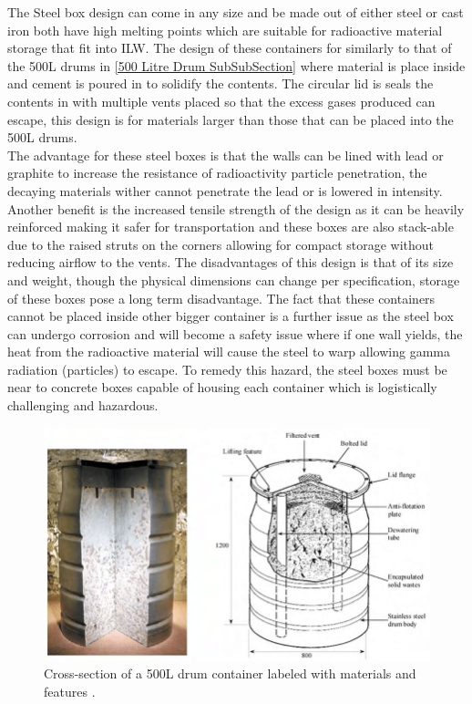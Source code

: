 The Steel box design can come in any size and be made out of either steel or cast iron both have high melting points which are suitable for radioactive material storage that fit into ILW. The design of these containers for similarly to that of the 500L drums in \cref{500 Litre Drum SubSubSection} where material is place inside and cement is poured in to solidify the contents. The circular lid is seals the contents in with multiple vents placed so that the excess gases produced can escape, this design is for materials larger than those that can be placed into the 500L drums. \\

The advantage for these steel boxes is that the walls can be lined with lead or graphite to increase the resistance of radioactivity particle penetration, the decaying materials wither cannot penetrate the lead or is lowered in intensity. Another benefit is the increased tensile strength of the design as it can be heavily reinforced making it safer for transportation and these boxes are also stack-able due to the raised struts on the corners allowing for compact storage without reducing airflow to the vents. The disadvantages of this design is that of its size and weight, though the physical dimensions can change per specification, storage of these boxes pose a long term disadvantage. The fact that these containers cannot be placed inside other bigger container is a further issue as the steel box can undergo corrosion and will become a safety issue where if one wall yields, the heat from the radioactive material will cause the steel to warp allowing gamma radiation (particles) to escape. To remedy this hazard, the steel boxes must be near to concrete boxes capable of housing each container which is logistically challenging and hazardous.

\begin{figure}[H]
\centering
\includegraphics[scale=0.5]{Media/NuclearResearch/shows-the-500-litre-drum-waste-package-designs-The-majority-of-the-containers-are-made.png}
\caption{Cross-section of a 500L drum container labeled with materials and features \cite{500L}.}
\label{500L Drum}
\end{figure}

